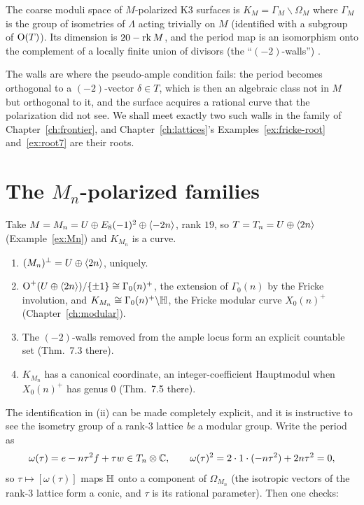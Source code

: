 \begin{theorem}\label{thm:dolgachev-moduli}
The coarse moduli space of $M$-polarized K3 surfaces is
$K_M=\Gamma_M\backslash\Omega_M$ where $\Gamma_M$ is the group of isometries of
$\Lambda$ acting trivially on $M$ (identified with a subgroup of $\operatorname{O}(T)$).
Its dimension is $20-\operatorname{rk} M$, and the period map is an isomorphism onto the
complement of a locally finite union of divisors (the ``$(-2)$-walls'')
\cite[Thm.~3.1, Prop.~3.3, Thm.~7.3]{Dolgachev1996}.
\end{theorem}

The walls are where the pseudo-ample condition fails: the period becomes
orthogonal to a $(-2)$-vector $\delta\in T$, which is then an algebraic class
not in $M$ but orthogonal to it, and the surface acquires a rational curve
that the polarization did not see. We shall meet exactly two such walls in the
family of Chapter~\ref{ch:frontier}, and Chapter~\ref{ch:lattices}'s
Examples~\ref{ex:fricke-root} and~\ref{ex:root7} are their roots.

\section{The $M_n$-polarized families}

Take $M=M_n=U\oplus E_8(-1)^2\oplus\langle -2n\rangle$, rank $19$, so $T=T_n=U\oplus\langle 2n\rangle$
(Example~\ref{ex:Mn}) and $K_{M_n}$ is a curve.

\begin{theorem}\label{thm:Mn}
\begin{enumerate}
\item $(M_n)^{\perp}=U\oplus\langle 2n\rangle$, uniquely.
\item $\operatorname{O}^{+}(U\oplus\langle 2n\rangle)/\{\pm1\}\cong\Gamma_0(n)^{+}$, the extension
  of $\Gamma_0(n)$ by the Fricke involution, and
  $K_{M_n}\cong\Gamma_0(n)^{+}\backslash\mathbb{H}$, the Fricke modular curve
  $X_0(n)^{+}$ (Chapter~\ref{ch:modular}).
\item The $(-2)$-walls removed from the ample locus form an explicit countable
  set (Thm.~7.3 there).
\item $K_{M_n}$ has a canonical coordinate, an integer-coefficient Hauptmodul
  when $X_0(n)^+$ has genus $0$ (Thm.~7.5 there).
\end{enumerate}
\end{theorem}

The identification in (ii) can be made completely explicit, and it is
instructive to see the isometry group of a rank-3 lattice \emph{be} a modular
group. Write the period as
\[
  \omega(\tau)=e-n\tau^2f+\tau w\in T_n\otimes\mathbb{C},\qquad
  \omega(\tau)^2 = 2\cdot1\cdot(-n\tau^2)+2n\tau^2=0 ,
\]
so $\tau\mapsto[\omega(\tau)]$ maps $\mathbb{H}$ onto a component of $\Omega_{M_n}$
(the isotropic vectors of the rank-3 lattice form a conic, and $\tau$ is its
rational parameter). Then one checks:

